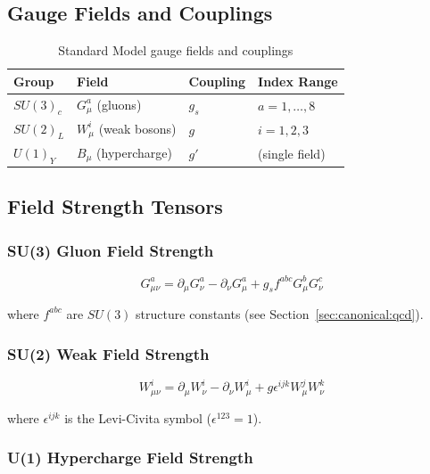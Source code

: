 \subsection{Gauge Fields and Couplings}

\begin{table}[h]
\centering
\begin{tabular}{|l|l|l|l|}
\hline
\textbf{Group} & \textbf{Field} & \textbf{Coupling} & \textbf{Index Range} \\
\hline
$SU(3)_c$ & $G^a_\mu$ (gluons) & $g_s$ & $a = 1, \ldots, 8$ \\
$SU(2)_L$ & $W^i_\mu$ (weak bosons) & $g$ & $i = 1, 2, 3$ \\
$U(1)_Y$ & $B_\mu$ (hypercharge) & $g'$ & (single field) \\
\hline
\end{tabular}
\caption{Standard Model gauge fields and couplings}
\label{tab:canonical:sm_fields}
\end{table}

\subsection{Field Strength Tensors}

\subsubsection{SU(3) Gluon Field Strength}

\begin{equation}
\label{eq:canonical:sm_gluon}
G^a_{\mu\nu} = \partial_\mu G^a_\nu - \partial_\nu G^a_\mu + g_s f^{abc} G^b_\mu G^c_\nu
\end{equation}

where $f^{abc}$ are $SU(3)$ structure constants (see Section~\ref{sec:canonical:qcd}).

\subsubsection{SU(2) Weak Field Strength}

\begin{equation}
\label{eq:canonical:sm_weak}
W^i_{\mu\nu} = \partial_\mu W^i_\nu - \partial_\nu W^i_\mu + g \epsilon^{ijk} W^j_\mu W^k_\nu
\end{equation}

where $\epsilon^{ijk}$ is the Levi-Civita symbol ($\epsilon^{123} = 1$).

\subsubsection{U(1) Hypercharge Field Strength}

